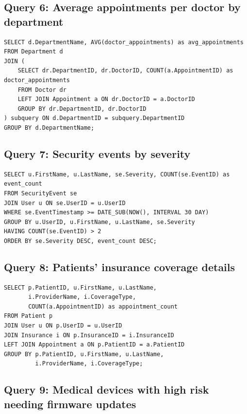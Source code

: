 \subsection*{Query 6: Average appointments per doctor by department}

\begin{verbatim}
SELECT d.DepartmentName, AVG(doctor_appointments) as avg_appointments
FROM Department d
JOIN (
    SELECT dr.DepartmentID, dr.DoctorID, COUNT(a.AppointmentID) as doctor_appointments
    FROM Doctor dr
    LEFT JOIN Appointment a ON dr.DoctorID = a.DoctorID
    GROUP BY dr.DepartmentID, dr.DoctorID
) subquery ON d.DepartmentID = subquery.DepartmentID
GROUP BY d.DepartmentName;
\end{verbatim}

\subsection*{Query 7: Security events by severity}

\begin{verbatim}
SELECT u.FirstName, u.LastName, se.Severity, COUNT(se.EventID) as event_count
FROM SecurityEvent se
JOIN User u ON se.UserID = u.UserID
WHERE se.EventTimestamp >= DATE_SUB(NOW(), INTERVAL 30 DAY)
GROUP BY u.UserID, u.FirstName, u.LastName, se.Severity
HAVING COUNT(se.EventID) > 2
ORDER BY se.Severity DESC, event_count DESC;
\end{verbatim}

\subsection*{Query 8: Patients' insurance coverage details}

\begin{verbatim}
SELECT p.PatientID, u.FirstName, u.LastName, 
       i.ProviderName, i.CoverageType,
       COUNT(a.AppointmentID) as appointment_count
FROM Patient p
JOIN User u ON p.UserID = u.UserID
JOIN Insurance i ON p.InsuranceID = i.InsuranceID
LEFT JOIN Appointment a ON p.PatientID = a.PatientID
GROUP BY p.PatientID, u.FirstName, u.LastName, 
         i.ProviderName, i.CoverageType;
\end{verbatim}

\subsection*{Query 9: Medical devices with high risk needing firmware updates}

